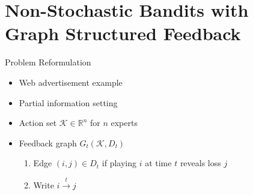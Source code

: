 \documentclass{beamer}
\begin{document}


\section{Non-Stochastic Bandits with Graph Structured Feedback}
\begin{frame}{Problem Reformulation}
  \begin{itemize}
    \item Web advertisement example

    \item Partial information setting

    \item Action set $\mathcal{K}\in \mathbb{R}^n$ for $n$ experts
    \item Feedback graph $G_t(\mathcal{K}, D_t)$ 
    \begin{enumerate}
      \item Edge $(i,j)\in D_t$ if playing $i$ at time $t$ reveals loss $j$
      \item Write $i\overset{t}{\to}j$
    \end{enumerate}
  \end{itemize}
\end{frame}
\end{document}
